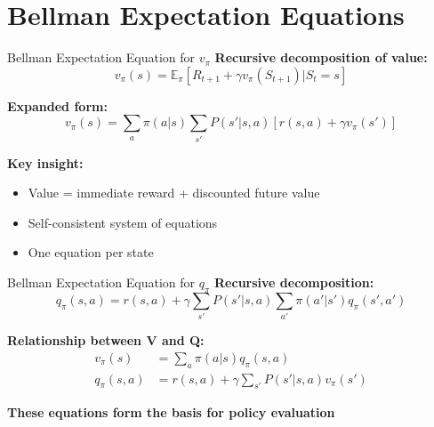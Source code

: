 \documentclass[aspectratio=169,10pt]{beamer}
\begin{document}
\section{Bellman Expectation Equations}

\begin{frame}{Bellman Expectation Equation for $v_\pi$}
\textbf{Recursive decomposition of value:}
\begin{equation}
v_\pi(s) = \mathbb{E}_\pi[R_{t+1} + \gamma v_\pi(S_{t+1}) | S_t = s]
\end{equation}

\textbf{Expanded form:}
\begin{equation}
v_\pi(s) = \sum_a \pi(a|s) \sum_{s'} P(s'|s,a) [r(s,a) + \gamma v_\pi(s')]
\end{equation}

\textbf{Key insight:}
\begin{itemize}
    \item Value = immediate reward + discounted future value
    \item Self-consistent system of equations
    \item One equation per state
\end{itemize}
\end{frame}

\begin{frame}{Bellman Expectation Equation for $q_\pi$}
\textbf{Recursive decomposition:}
\begin{equation}
q_\pi(s,a) = r(s,a) + \gamma \sum_{s'} P(s'|s,a) \sum_{a'} \pi(a'|s') q_\pi(s',a')
\end{equation}

\textbf{Relationship between V and Q:}
\begin{align}
v_\pi(s) &= \sum_a \pi(a|s) q_\pi(s,a) \\
q_\pi(s,a) &= r(s,a) + \gamma \sum_{s'} P(s'|s,a) v_\pi(s')
\end{align}

\textbf{These equations form the basis for policy evaluation}
\end{frame}
\end{document}
